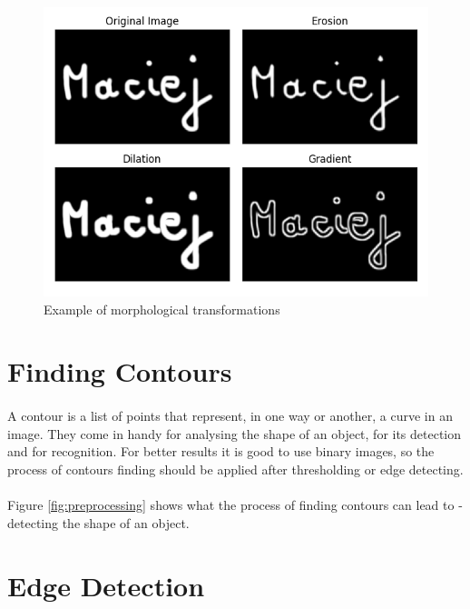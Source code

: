\begin{figure}[H]
	\centering
	\includegraphics[width=\textwidth]{images/morphological}
	\caption{Example of morphological transformations}
	\label{fig:morphological_examples}
\end{figure}

\section{Finding Contours}
\paragraph{}
A contour is a list of points that represent, in one way or another, a curve in an image.\cite{learning-opencv-3} They come in handy for analysing the shape of an object, for its detection and for recognition. For better results it is good to use binary images, so the process of contours finding should be applied after thresholding or edge detecting.

\paragraph{}
Figure \ref{fig:preprocessing} shows what the process of finding contours can lead to - detecting the shape of an object.

\section{Edge Detection}
